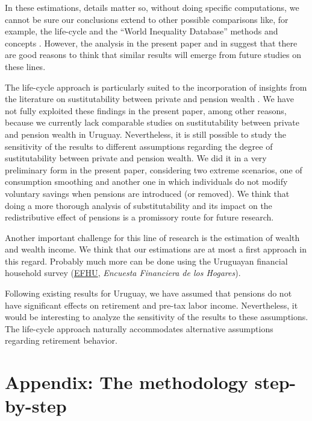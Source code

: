 \documentclass{article}
\begin{document}
In these estimations, details matter so, without doing specific computations,  we cannot be sure our conclusions extend to other possible comparisons like, for example, the life-cycle and the ``World Inequality Database'' methods and concepts \parencite{Blanchet2021}. However, the analysis in the present paper and in \textcite{Forteza2023} suggest that there are good reasons to think that similar results will emerge from future studies on these lines.

The life-cycle approach  is particularly suited to the incorporation of insights from the literature on sustitutability between private and pension wealth \parencite{Attanasio2003a, Attanasio2003b, Gale1998}. We have not fully exploited these findings  in the present paper, among other reasons, because we currently lack comparable studies on sustitutability between private and pension wealth in Uruguay. Nevertheless, it is still possible to study the sensitivity of the results to different assumptions regarding the degree of sustitutability between private and pension wealth. We did it in a very preliminary form in the present paper, considering two extreme scenarios, one of consumption smoothing and another one in which individuals do not modify voluntary savings when pensions are introduced (or removed). We think that doing a more thorough analysis of substitutability and its impact on the redistributive effect of pensions is a promissory route for future research.

Another important challenge for this line of research is the estimation of wealth and wealth income. We think that our estimations are at most a first approach in this regard. Probably much more can be done using the Uruguayan financial household survey  (\href{https://cienciassociales.edu.uy/departamento-de-economia/investigacion/encuesta-financiera-de-los-hogares-uruguayos/}{EFHU}, \textit{Encuesta Financiera de los Hogares}).  

Following existing results for Uruguay, we have assumed that pensions do not have significant effects on retirement and pre-tax labor income. Nevertheless, it would be interesting to analyze the sensitivity of the results to these assumptions. The life-cycle approach naturally accommodates alternative assumptions regarding retirement behavior. 

\printbibliography[
heading=bibintoc,
title={Bibliography}
]



\section{Appendix: The methodology step-by-step} 
\end{document}
